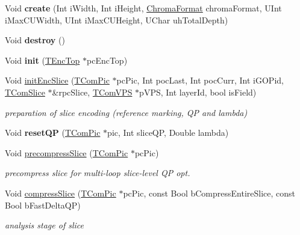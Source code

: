 \begin{DoxyCompactItemize}
\item 
\mbox{\label{class_t_enc_slice_a922ee306ecbc62fab4b232b759add77e}} 
Void {\bfseries create} (Int i\+Width, Int i\+Height, \hyperlink{_type_def_8h_a4a6c51c10f2eb04abc7209db7caff39f}{Chroma\+Format} chroma\+Format, U\+Int i\+Max\+C\+U\+Width, U\+Int i\+Max\+C\+U\+Height, U\+Char uh\+Total\+Depth)
\item 
\mbox{\label{class_t_enc_slice_a60fd5ff9dcbd8074b59b9c70e54d8c0c}} 
Void {\bfseries destroy} ()
\item 
\mbox{\label{class_t_enc_slice_a6d4541b0d8f61d7874b17d318977c340}} 
Void {\bfseries init} (\hyperlink{class_t_enc_top}{T\+Enc\+Top} $\ast$pc\+Enc\+Top)
\item 
Void \hyperlink{class_t_enc_slice_aa1e5df49f326f979da1cc3e249b9f16b}{init\+Enc\+Slice} (\hyperlink{class_t_com_pic}{T\+Com\+Pic} $\ast$pc\+Pic, Int poc\+Last, Int poc\+Curr, Int i\+G\+O\+Pid, \hyperlink{class_t_com_slice}{T\+Com\+Slice} $\ast$\&rpc\+Slice, \hyperlink{class_t_com_v_p_s}{T\+Com\+V\+PS} $\ast$p\+V\+PS, Int layer\+Id, bool is\+Field)
\begin{DoxyCompactList}\small\item\em preparation of slice encoding (reference marking, QP and lambda) \end{DoxyCompactList}\item 
\mbox{\label{class_t_enc_slice_a45d65da87ca8cd283f9933c0b81f41a3}} 
Void {\bfseries reset\+QP} (\hyperlink{class_t_com_pic}{T\+Com\+Pic} $\ast$pic, Int slice\+QP, Double lambda)
\item 
Void \hyperlink{class_t_enc_slice_a1d51494d1ae81824d3ba5296d7715e8e}{precompress\+Slice} (\hyperlink{class_t_com_pic}{T\+Com\+Pic} $\ast$pc\+Pic)
\begin{DoxyCompactList}\small\item\em precompress slice for multi-\/loop slice-\/level QP opt. \end{DoxyCompactList}\item 
Void \hyperlink{class_t_enc_slice_ae2a0de7e3f92ebb669fd50116bf1bbf6}{compress\+Slice} (\hyperlink{class_t_com_pic}{T\+Com\+Pic} $\ast$pc\+Pic, const Bool b\+Compress\+Entire\+Slice, const Bool b\+Fast\+Delta\+QP)
\begin{DoxyCompactList}\small\item\em analysis stage of slice \end{DoxyCompactList}\item 

\end{DoxyCompactItemize}

